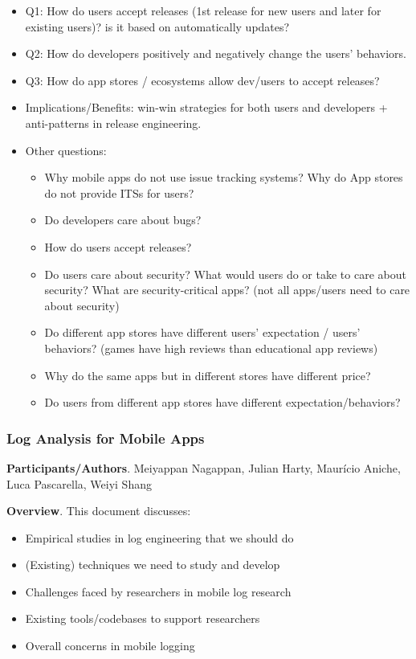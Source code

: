\documentclass[a4paper]{article}
\newcommand{\smallsection}[1]{\noindent \textbf{#1}. }
\begin{document}
\begin{itemize}
    \tightlist
    \item Q1: How do users accept releases (1st release for new users and later for existing users)? is it based on automatically updates?
    \item Q2: How do developers positively and negatively change the users' behaviors.
    \item Q3: How do app stores / ecosystems allow dev/users to accept releases?
    \item Implications/Benefits: win-win strategies for both users and developers + anti-patterns in release engineering.
    \item Other questions:
        \begin{itemize}
            \tightlist
            \item Why mobile apps do not use issue tracking systems? Why do App stores do not provide ITSs for users?
            \item Do developers care about bugs?
            \item How do users accept releases?
            \item Do users care about security? What would users do or take to care about security? What are security-critical apps? (not all apps/users need to care about security)
            \item Do different app stores have different users' expectation / users' behaviors? (games have high reviews than educational app reviews)
            \item Why do the same apps but in different stores have different price?
            \item Do users from different app stores have different expectation/behaviors?
        \end{itemize}
\end{itemize}

\subsubsection{Log Analysis for Mobile Apps}

\smallsection{Participants/Authors}
Meiyappan Nagappan, Julian Harty, Maur\'{i}cio Aniche, Luca Pascarella, Weiyi Shang

\smallsection{Overview}
This document discusses:

\begin{itemize}
\tightlist
\item
  Empirical studies in log engineering that we should do
\item
  (Existing) techniques we need to study and develop
\item
  Challenges faced by researchers in mobile log research
\item
  Existing tools/codebases to support researchers
\item
  Overall concerns in mobile logging
\end{itemize}
\end{document}
